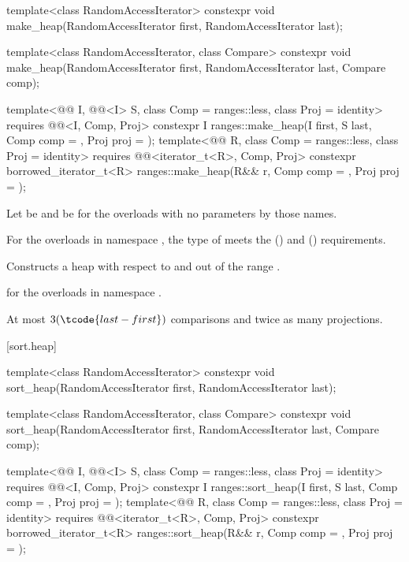 %
\begin{itemdecl}
template<class RandomAccessIterator>
  constexpr void make_heap(RandomAccessIterator first, RandomAccessIterator last);

template<class RandomAccessIterator, class Compare>
  constexpr void make_heap(RandomAccessIterator first, RandomAccessIterator last,
                           Compare comp);

template<@@ I, @@<I> S, class Comp = ranges::less,
         class Proj = identity>
  requires @@<I, Comp, Proj>
  constexpr I
    ranges::make_heap(I first, S last, Comp comp = {}, Proj proj = {});
template<@@ R, class Comp = ranges::less, class Proj = identity>
  requires @@<iterator_t<R>, Comp, Proj>
  constexpr borrowed_iterator_t<R>
    ranges::make_heap(R&& r, Comp comp = {}, Proj proj = {});
\end{itemdecl}

\begin{itemdescr}
\pnum
Let  be 
and  be 
for the overloads with no parameters by those names.

\pnum
\expects
For the overloads in namespace ,
the type of  meets
the  () and
 () requirements.

\pnum
\effects
Constructs a heap with respect to  and 
out of the range .

\pnum
\returns
{} for the overloads in namespace .

\pnum
\complexity
At most $3(\tcode{last - first})$ comparisons and twice as many projections.
\end{itemdescr}

[sort.heap]{}

%
\begin{itemdecl}
template<class RandomAccessIterator>
  constexpr void sort_heap(RandomAccessIterator first, RandomAccessIterator last);

template<class RandomAccessIterator, class Compare>
  constexpr void sort_heap(RandomAccessIterator first, RandomAccessIterator last,
                           Compare comp);

template<@@ I, @@<I> S, class Comp = ranges::less,
         class Proj = identity>
  requires @@<I, Comp, Proj>
  constexpr I
    ranges::sort_heap(I first, S last, Comp comp = {}, Proj proj = {});
template<@@ R, class Comp = ranges::less, class Proj = identity>
  requires @@<iterator_t<R>, Comp, Proj>
  constexpr borrowed_iterator_t<R>
    ranges::sort_heap(R&& r, Comp comp = {}, Proj proj = {});
\end{itemdecl}

